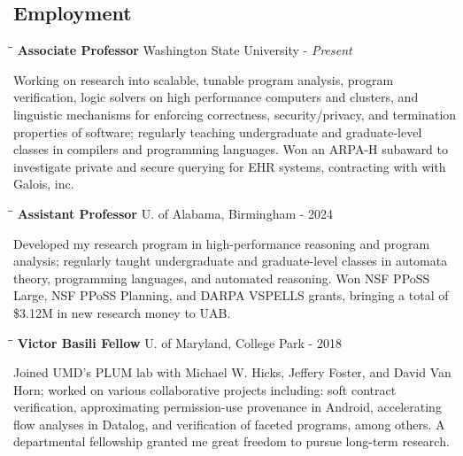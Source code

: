 \documentclass[line]{res}
\begin{document}
\begin{resume}
\section{\large Employment}
   \vspace{-0.05in}  
   \begin{tabbing}
    \hspace{2.25in}\= \hspace{2.25in}\= \kill %
    {\bf Associate Professor} \>Washington State University   - \textit{Present}
   \end{tabbing}\vspace{-0.5cm}      %
   Working on research into scalable, tunable program analysis, program verification, logic solvers on high performance computers and clusters, and linguistic mechanisms for enforcing correctness, security/privacy, and termination properties of software; regularly teaching undergraduate and graduate-level classes in compilers and programming languages. Won an ARPA-H subaward to investigate private and secure querying for EHR systems, contracting with with Galois, inc.
   \vspace{-0.2cm}  
   \begin{tabbing}
    \hspace{2.25in}\= \hspace{2.25in}\= \kill %
    {\bf Assistant Professor} \>U. of Alabama, Birmingham   - 2024
   \end{tabbing}\vspace{-0.5cm}      %
   Developed my research program in high-performance reasoning and program analysis; regularly taught undergraduate and graduate-level classes in automata theory, programming languages, and automated reasoning. Won NSF PPoSS Large, NSF PPoSS Planning, and DARPA VSPELLS grants, bringing a total of \$3.12M in new research money to UAB.
   \vspace{-0.2cm}  
   \begin{tabbing}
    \hspace{2.25in}\= \hspace{2.25in}\= \kill %
    {\bf Victor Basili Fellow} \>U. of Maryland, College Park   - 2018
   \end{tabbing}\vspace{-0.5cm}      %
   Joined UMD's PLUM lab with Michael W. Hicks, Jeffery Foster, and David Van Horn; worked on various collaborative projects including: soft contract verification, approximating permission-use provenance in Android, accelerating flow analyses in Datalog, and verification of faceted programs, among others. A departmental fellowship granted me great freedom to pursue long-term research.

\end{resume}
\end{document}
